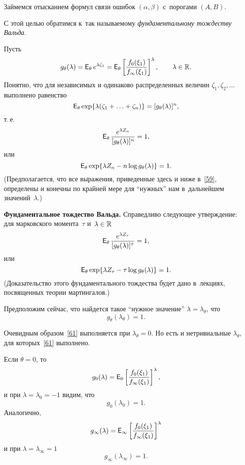 Займемся отысканием формул связи ошибок $(\alpha,\beta)$
с~порогами $(A,B)$.

С этой целью обратимся к~так называемому \textit{фундаментальному
	тождеству Вальда}.

Пусть
\begin{equation}
\label{56}%
g_{\theta}(\lambda)
=\E_{\theta}e^{\lambda\zeta_1}=\E_{\theta}
\left[\frac{f_0(\xi_1)}{f_{\infty}(\xi_1)}\right]^{\lambda},
\qquad
\lambda\in\R.
\end{equation}
Понятно, что для независимых и одинаково распределенных величин
$\zeta_1,\zeta_2,\ldots$ выполнено равенство
\[
\E_{\theta}\exp\{\lambda(\zeta_1+\ldots+\zeta_n)\}
=[g_{\theta}(\lambda)]^n,
\]
т.\,е.
\begin{equation}
\label{57}%
\E_{\theta}\frac{e^{\lambda Z_n}}{[g_{\theta}(\lambda)]^n}=1,
\end{equation}
или
\begin{equation}
\label{58}
\E_{\theta}\exp\{\lambda Z_n-n\log g_{\theta}(\lambda)\}=1.
\end{equation}
(Предполагается, что все выражения, приведенные здесь и ниже
в~\eqref{59}, определены и конечны по крайней мере для ``нужных''
нам в~дальнейшем значений~$\lambda$.)

\textbf{Фундаментальное тождество Вальда.} Справедливо следующее
утверждение: для марковского момента~$\tau$ и~$\lambda\in\mathbb{R}$
\begin{equation}
\label{59}%
\E_{\theta}\frac{e^{\lambda
		Z_{\tau}}}{[g_{\theta}(\lambda)]^{\tau}}=1,
\end{equation}
или
\begin{equation}
\label{60}
\E_{\theta}
\exp\{\lambda Z_\tau-\tau\log g_\theta(\lambda)\}=1.
\end{equation}
(Доказательство этого фундаментального тождества будет дано
в~лекциях, посвященных теории мартингалов.)

Предположим сейчас, что найдется такое ``нужное значение''
$\lambda=\lambda_{\theta}$, что
\begin{equation}
\label{61}%
g_{\theta}(\lambda_{\theta})=1.
\end{equation}

Очевидным образом~\eqref{61} выполняется при $\lambda_{\theta}=0$.
Но есть и нетривиальные $\lambda_{\theta}$, для которых~\eqref{61}
выполнено.

Если $\theta=0$, то
\[
g_0(\lambda)=\E_0\left[\frac{f_0(\xi_1)}{f_{\infty}(\xi_1)}\right]^{\lambda},
\]
и при $\lambda=\lambda_0=-1$ видим, что
\begin{equation}
\label{62}%
g_0(\lambda_0)=1.
\end{equation}
Аналогично,
\[
g_{\infty}(\lambda)=\E_{\infty}\left[\frac{f_0(\xi_1)}{f_{\infty}(\xi_1)}\right]^{\lambda}
\]
и при $\lambda=\lambda_{\infty}=1$
\begin{equation}
\label{63}%
g_{\infty}(\lambda_{\infty})=1.
\end{equation}

